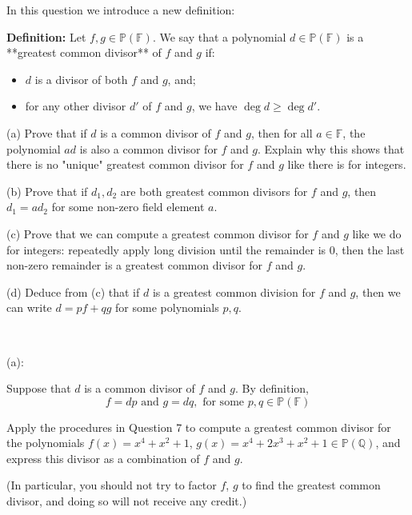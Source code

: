 \documentclass{article}
\theoremstyle{plain} %
\numberwithin{thm}{section} %
\theoremstyle{definition}
\begin{document}
    \newpage
    \begin{question}{7}
        In this question we introduce a new definition:

        \textbf{Definition:} Let \(f, g \in \mathbb{P}(\mathbb{F})\). We say that a polynomial \(d \in \mathbb{P}(\mathbb{F})\) is a **greatest common divisor** of \(f\) and \(g\) if:

        \begin{itemize}
            \item \(d\) is a divisor of both \(f\) and \(g\), and;
            \item for any other divisor \(d'\) of \(f\) and \(g\), we have \(\deg d \geq \deg d'\).
        \end{itemize}

        (a) Prove that if \(d\) is a common divisor of \(f\) and \(g\), then for all \(a \in \mathbb{F}\), the polynomial \(ad\) is also a common divisor for \(f\) and \(g\). Explain why this shows that there is no "unique" greatest common divisor for \(f\) and \(g\) like there is for integers.

        (b) Prove that if \(d_1, d_2\) are both greatest common divisors for \(f\) and \(g\), then \(d_1 = ad_2\) for some non-zero field element \(a\).

        (c) Prove that we can compute a greatest common divisor for \(f\) and \(g\) like we do for integers: repeatedly apply long division until the remainder is 0, then the last non-zero remainder is a greatest common divisor for \(f\) and \(g\).

        (d) Deduce from (c) that if \(d\) is a greatest common division for \(f\) and \(g\), then we can write \(d = pf + qg\) for some polynomials \(p, q\).

        \tcblower
        \ 

        (a):

        Suppose that \(d\) is a common divisor of \(f\) and \(g\). By definition,
        \[
            f = dp \text{ and } g = dq, \text{ for some } p, q \in \mathbb{P} (\mathbb{F})
        \]
    \end{question}
    \newpage
    \begin{question}{8}
        Apply the procedures in Question 7 to compute a greatest common divisor for the polynomials
        \(f(x) = x^4 + x^2 + 1\), \(g(x) = x^4 + 2x^3 + x^2 + 1 \in \mathbb{P}(\mathbb{Q})\), and express this divisor as a combination
        of \(f\) and \(g\).

        (In particular, you should not try to factor \(f\), \(g\) to find the greatest common divisor, and doing
        so will not receive any credit.)
    \end{question}
\end{document}
